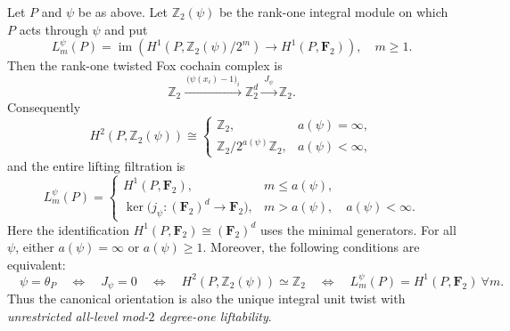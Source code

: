 \begin{theorem}
\label{thm:dyadic-twisted-fox-lifting-depth}
Let $P$ and $\psi$ be as above.  Let
$\mathbb Z_2(\psi)$ be the rank-one integral module
on which $P$ acts through $\psi$ and put
\begin{equation}\label{eq:dyadic-psi-lifting-def}
L_m^\psi(P)=
\operatorname{im}\left(
H^1(P,\mathbb Z_2(\psi)/2^m)
\longrightarrow H^1(P,\mathbf F_2)\right),
\quad m\ge1.
\end{equation}
Then the rank-one twisted Fox cochain complex is
\begin{equation}\label{eq:dyadic-psi-three-term-fox}
\mathbb Z_2
\xrightarrow{\ \bigl(\psi(x_i)-1\bigr)_i\ }
\mathbb Z_2^d
\xrightarrow{\ J_\psi\ }
\mathbb Z_2.
\end{equation}
Consequently
\begin{equation}\label{eq:dyadic-psi-h2}
H^2(P,\mathbb Z_2(\psi))
\cong
\begin{cases}
\mathbb Z_2,&a(\psi)=\infty,\\
\mathbb Z_2/2^{a(\psi)}\mathbb Z_2,
  &a(\psi)<\infty,
\end{cases}
\end{equation}
and the entire lifting filtration is
\begin{equation}\label{eq:dyadic-psi-lifting-formula}
L_m^\psi(P)=
\begin{cases}
H^1(P,\mathbf F_2),
 &m\le a(\psi),\\
\ker\bigl(j_\psi:(\mathbf F_2)^d\to\mathbf F_2\bigr),
 &m>a(\psi),\quad a(\psi)<\infty.
\end{cases}
\end{equation}
Here the identification $H^1(P,\mathbf F_2)
\cong(\mathbf F_2)^d$ uses the minimal generators.
For all $\psi$, either $a(\psi)=\infty$ or
$a(\psi)\ge1$.  Moreover, the following conditions
are equivalent:
\begin{equation}\label{eq:dyadic-psi-orientation-criterion}
\boxed{\quad
\psi=\theta_P
\quad\Longleftrightarrow\quad
J_\psi=0
\quad\Longleftrightarrow\quad
H^2(P,\mathbb Z_2(\psi))\simeq\mathbb Z_2
\quad\Longleftrightarrow\quad
L_m^\psi(P)=H^1(P,\mathbf F_2)\ \forall m.
\quad}
\end{equation}
Thus the canonical orientation is also the unique
integral unit twist with \emph{unrestricted all-level
mod-$2$ degree-one liftability}.
\end{theorem}

